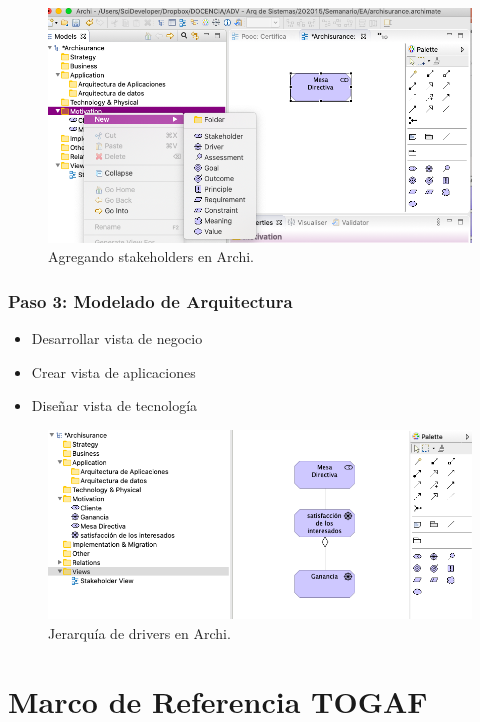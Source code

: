 \begin{figure}[h]
\centering
\includegraphics[scale=0.35]{Pictures/addstake.png}
\caption{Agregando stakeholders en Archi.}
\label{fig:stakeholders}
\end{figure}

\subsubsection{Paso 3: Modelado de Arquitectura}
\begin{itemize}
\item Desarrollar vista de negocio
\item Crear vista de aplicaciones
\item Diseñar vista de tecnología
\end{itemize}

\begin{figure}[h]
\centering
\includegraphics[scale=0.35]{Pictures/jeraquiadrivers.png}
\caption{Jerarquía de drivers en Archi.}
\label{fig:drivers}
\end{figure}




\section{Marco de Referencia TOGAF}

